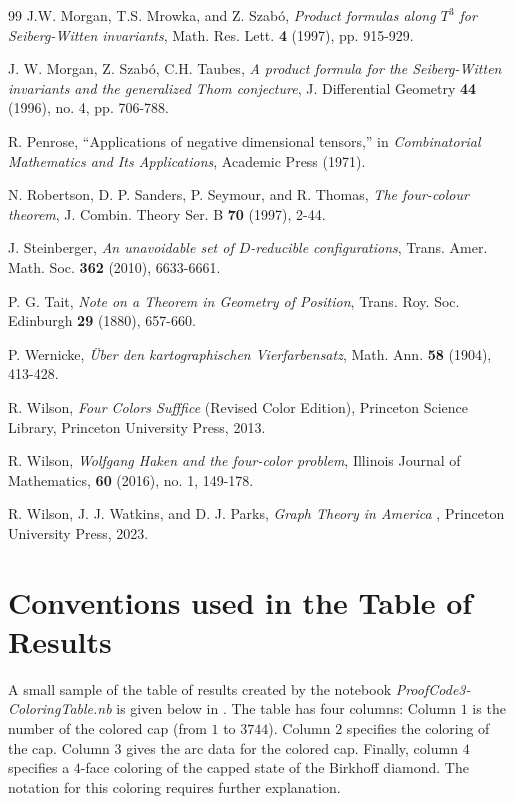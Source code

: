 \documentclass[12pt]{amsart}
\theoremstyle{definition}
\theoremstyle{remark}
\numberwithin{equation}{section}
\begin{document}
\begin{thebibliography}{99}
 J.W. Morgan, T.S. Mrowka, and Z. Szab\'{o}, {\em Product formulas along $T^3$ for Seiberg-Witten invariants}, Math. Res. Lett. {\bf 4} (1997), pp. 915-929.

 J. W. Morgan, Z. Szab\'{o}, C.H. Taubes, {\em A product formula for the Seiberg-Witten invariants and the generalized Thom conjecture}, J. Differential Geometry {\bf 44} (1996), no. 4, pp. 706-788.

 R. Penrose, ``Applications of negative dimensional tensors,'' in {\em Combinatorial Mathematics and Its Applications}, Academic Press (1971).

 N. Robertson, D. P. Sanders, P. Seymour, and R. Thomas, {\em The four-colour theorem}, J. Combin. Theory Ser. B {\bf 70} (1997), 2-44.

 J. Steinberger, {\em An unavoidable set of $D$-reducible configurations}, Trans. Amer. Math. Soc. {\bf 362} (2010), 6633-6661.

 P. G. Tait, {\em Note on a Theorem in Geometry of Position}, Trans. Roy. Soc. Edinburgh {\bf 29} (1880), 657-660.

 P. Wernicke, {\em \"{U}ber den kartographischen Vierfarbensatz}, Math. Ann. {\bf 58} (1904), 413-428.

 R. Wilson, {\em Four Colors Sufffice} (Revised Color Edition), Princeton Science Library, Princeton University Press, 2013.

 R. Wilson, {\em Wolfgang Haken and the four-color problem}, Illinois Journal of Mathematics, {\bf 60} (2016), no. 1, 149-178.

 R. Wilson, J. J. Watkins, and D. J. Parks, {\em Graph Theory in America} , Princeton University Press, 2023.

\end{thebibliography}


\appendix
\section{Conventions used in the Table of Results}\label{appendix:table-of-results}

A small sample of the table of results created by the notebook \emph{ProofCode3-ColoringTable.nb} is given below in .  The table has four columns:  Column $1$ is the number of the colored cap (from $1$ to $3744$).  Column $2$ specifies the coloring of the cap.  Column $3$ gives the arc data for the colored cap.  Finally, column $4$ specifies a $4$-face coloring of the capped state of the Birkhoff diamond.  The notation for this coloring requires  further explanation.
\end{document}
